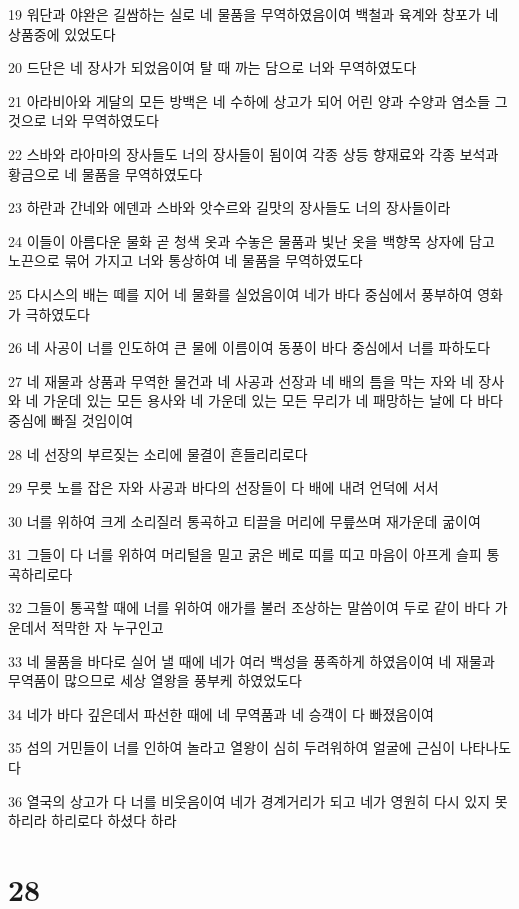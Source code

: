 \par 19 워단과 야완은 길쌈하는 실로 네 물품을 무역하였음이여 백철과 육계와 창포가 네 상품중에 있었도다
\par 20 드단은 네 장사가 되었음이여 탈 때 까는 담으로 너와 무역하였도다
\par 21 아라비아와 게달의 모든 방백은 네 수하에 상고가 되어 어린 양과 수양과 염소들 그것으로 너와 무역하였도다
\par 22 스바와 라아마의 장사들도 너의 장사들이 됨이여 각종 상등 향재료와 각종 보석과 황금으로 네 물품을 무역하였도다
\par 23 하란과 간네와 에덴과 스바와 앗수르와 길맛의 장사들도 너의 장사들이라
\par 24 이들이 아름다운 물화 곧 청색 옷과 수놓은 물품과 빛난 옷을 백향목 상자에 담고 노끈으로 묶어 가지고 너와 통상하여 네 물품을 무역하였도다
\par 25 다시스의 배는 떼를 지어 네 물화를 실었음이여 네가 바다 중심에서 풍부하여 영화가 극하였도다
\par 26 네 사공이 너를 인도하여 큰 물에 이름이여 동풍이 바다 중심에서 너를 파하도다
\par 27 네 재물과 상품과 무역한 물건과 네 사공과 선장과 네 배의 틈을 막는 자와 네 장사와 네 가운데 있는 모든 용사와 네 가운데 있는 모든 무리가 네 패망하는 날에 다 바다 중심에 빠질 것임이여
\par 28 네 선장의 부르짖는 소리에 물결이 흔들리리로다
\par 29 무릇 노를 잡은 자와 사공과 바다의 선장들이 다 배에 내려 언덕에 서서
\par 30 너를 위하여 크게 소리질러 통곡하고 티끌을 머리에 무릎쓰며 재가운데 굶이여
\par 31 그들이 다 너를 위하여 머리털을 밀고 굵은 베로 띠를 띠고 마음이 아프게 슬피 통곡하리로다
\par 32 그들이 통곡할 때에 너를 위하여 애가를 불러 조상하는 말씀이여 두로 같이 바다 가운데서 적막한 자 누구인고
\par 33 네 물품을 바다로 실어 낼 때에 네가 여러 백성을 풍족하게 하였음이여 네 재물과 무역품이 많으므로 세상 열왕을 풍부케 하였었도다
\par 34 네가 바다 깊은데서 파선한 때에 네 무역품과 네 승객이 다 빠졌음이여
\par 35 섬의 거민들이 너를 인하여 놀라고 열왕이 심히 두려워하여 얼굴에 근심이 나타나도다
\par 36 열국의 상고가 다 너를 비웃음이여 네가 경계거리가 되고 네가 영원히 다시 있지 못하리라 하리로다 하셨다 하라

\chapter{28}

